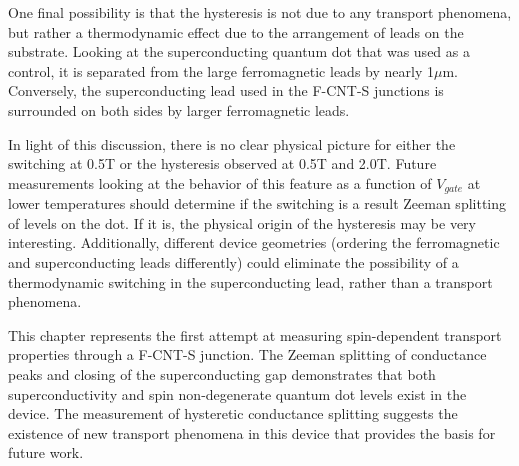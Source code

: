 One final possibility is that the hysteresis is not due to any transport phenomena, but rather a thermodynamic effect due to the arrangement of leads on the substrate. Looking at the superconducting quantum dot that was used as a control, it is separated from the large ferromagnetic leads by nearly 1$\mu$m. Conversely, the superconducting lead used in the F-CNT-S junctions is surrounded on both sides by larger ferromagnetic leads. 

In light of this discussion, there is no clear physical picture for either the switching at 0.5T or the hysteresis observed at 0.5T and 2.0T. Future measurements looking at the behavior of this feature as a function of $V_{gate}$ at lower temperatures should determine if the switching is a result Zeeman splitting of levels on the dot. If it is, the physical origin of the hysteresis may be very interesting. Additionally, different device geometries (ordering the ferromagnetic and superconducting leads differently) could eliminate the possibility of a thermodynamic switching in the superconducting lead, rather than a transport phenomena.

This chapter represents the first attempt at measuring spin-dependent transport properties through a F-CNT-S junction. The Zeeman splitting of conductance peaks and closing of the superconducting gap demonstrates that both superconductivity and spin non-degenerate quantum dot levels exist in the device. The measurement of hysteretic conductance splitting suggests the existence of new transport phenomena in this device that provides the basis for future work.